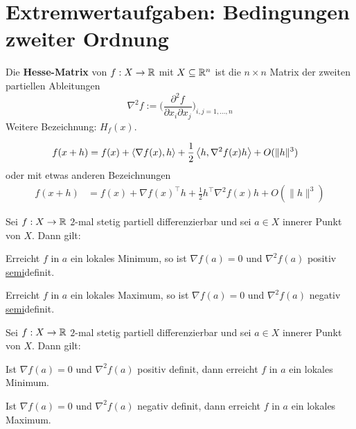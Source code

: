 \section{Extremwertaufgaben: Bedingungen zweiter Ordnung} 


\begin{defn}
	Die \textbf{Hesse-Matrix} von $f : X \to \mathbb{R}$ mit $X \subseteq \mathbb{R}^n$ ist die $n \times n$ Matrix der zweiten partiellen Ableitungen
	\[
		\nabla^2 f := \biggl( \frac{\partial^2 f}{\partial x_i \partial x_j}  \biggr)_{i,j=1,\ldots,n}
	\]
	Weitere Bezeichnung: $H_f(x)$. 
\end{defn} 

\begin{bem}
	\begin{align*}
	f(x+h) & = f(x) + \left< \nabla f (x) , h \right> + \frac{1}{2} \left< h , \nabla^2 f(x) h \right> + O(\|h\|^3)
	\end{align*}
	oder mit etwas anderen Bezeichnungen
	\begin{align*} 
	f(x+h) & = f(x) + \nabla f(x)^\top h + \frac{1}{2} h^\top \nabla^2f(x) h + O(\|h\|^3)
	\end{align*}
\end{bem} 

\begin{thm} 
	Sei $f : X \to \mathbb{R}$ $2$-mal stetig partiell differenzierbar und sei $a \in X$ innerer Punkt von $X$. Dann gilt: 
	\begin{enuma}
		\item Erreicht $f$ in $a$ ein lokales Minimum, so ist $\nabla f(a) =0$ und $\nabla^2 f(a)$ positiv \underline{semi}definit.
		\item Erreicht $f$ in $a$ ein lokales Maximum, so ist $\nabla f(a) =0$ und $\nabla^2 f(a)$ negativ \underline{semi}definit.
	\end{enuma}
\end{thm} 

\begin{thm}
	Sei $f : X \to \mathbb{R}$ $2$-mal stetig partiell differenzierbar und sei $a \in X$ innerer Punkt von $X$. Dann gilt: 
\begin{enuma}
	\item Ist $\nabla f(a) =0$ und $\nabla^2 f(a)$ positiv definit, dann erreicht $f$ in $a$ ein lokales Minimum.
	\item Ist $\nabla f(a) =0$ und $\nabla^2 f(a)$ negativ definit, dann erreicht $f$ in $a$ ein lokales Maximum.
\end{enuma}
\end{thm} 

